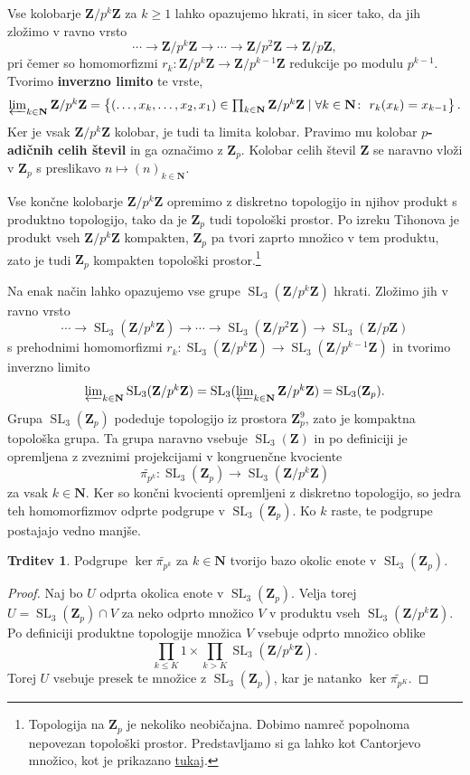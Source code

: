 \documentclass[11pt]{book}
\def\NN{\mathbf{N}}
\def\ZZ{\mathbf{Z}}
\DeclareMathOperator\SL{SL}
\def\definicija{\color{rdeca}\bf}
\theoremstyle{definition}
\theoremstyle{zgled}
\theoremstyle{zgledbrezstevilke}
\theoremstyle{odprtproblem}
\theoremstyle{domacanaloga}
\newenvironment{dokaz}
    {\color{siva}\begin{proof}}
    {\end{proof}}
\theoremstyle{izrek}
\newtheorem{trditev}[theorem]{Trditev}
\begin{document}
Vse kolobarje $\ZZ/p^k\ZZ$ za $k \geq 1$ lahko opazujemo hkrati, in sicer tako, da jih zložimo v ravno vrsto
\[
    \cdots \to \ZZ/p^k\ZZ \to \cdots \to \ZZ/p^2\ZZ \to \ZZ/p\ZZ,
\]
pri čemer so homomorfizmi $r_k \colon \ZZ/p^k\ZZ \to \ZZ/p^{k-1}\ZZ$ redukcije po modulu $p^{k-1}$. Tvorimo {\definicija inverzno limito} te vrste,
\[
    \textstyle \varprojlim_{k \in \NN} \ZZ/p^k\ZZ
    = \left\{
        (\dots, x_k, \dots, x_2, x_1) \in \prod_{k \in \NN} \ZZ/p^k\ZZ \mid
        \forall k \in \NN \colon \ r_k(x_k) = x_{k-1}
    \right\}.
\]
Ker je vsak $\ZZ/p^k\ZZ$ kolobar, je tudi ta limita kolobar. Pravimo mu kolobar {\definicija $p$-adičnih celih števil} in ga označimo z $\ZZ_p$. Kolobar celih števil $\ZZ$ se naravno vloži v $\ZZ_p$ s preslikavo $n \mapsto (n)_{k \in \NN}$.

Vse končne kolobarje $\ZZ/p^k\ZZ$ opremimo z diskretno topologijo in njihov produkt s produktno topologijo, tako da je $\ZZ_p$ tudi topološki prostor. Po izreku Tihonova je produkt vseh $\ZZ/p^k\ZZ$ kompakten, $\ZZ_p$ pa tvori zaprto množico v tem produktu, zato je tudi $\ZZ_p$ kompakten topološki prostor.\footnote{Topologija na $\ZZ_p$ je nekoliko neobičajna. Dobimo namreč popolnoma nepovezan topološki prostor. Predstavljamo si ga lahko kot Cantorjevo množico, kot je prikazano \href{http://roice3.org/padics/}{tukaj}.}

Na enak način lahko opazujemo vse grupe $\SL_3(\ZZ/p^k\ZZ)$ hkrati. Zložimo jih v ravno vrsto
\[
    \textstyle \cdots \to \SL_3(\ZZ/p^k\ZZ) \to \cdots \to \SL_3(\ZZ/p^2\ZZ) \to \SL_3(\ZZ/p\ZZ)
\]
s prehodnimi homomorfizmi $r_k \colon \SL_3(\ZZ/p^k\ZZ) \to \SL_3(\ZZ/p^{k-1}\ZZ)$ in tvorimo inverzno limito
\[
    \textstyle \varprojlim_{k \in \NN} \SL_3(\ZZ/p^k\ZZ)
    = \SL_3(\varprojlim_{k \in \NN} \ZZ/p^k\ZZ)
    = \SL_3(\ZZ_p).
\]
Grupa $\SL_3(\ZZ_p)$ podeduje topologijo iz prostora $\ZZ_p^9$, zato je kompaktna topološka grupa. Ta grupa naravno vsebuje $\SL_3(\ZZ)$ in po definiciji je opremljena z zveznimi projekcijami v kongruenčne kvociente 
\[
    \textstyle \widetilde{\pi_{p^k}} \colon \SL_3(\ZZ_p) \to \SL_3(\ZZ/p^k\ZZ)
\]
za vsak $k \in \NN$. Ker so končni kvocienti opremljeni z diskretno topologijo, so jedra teh homomorfizmov odprte podgrupe v $\SL_3(\ZZ_p)$. Ko $k$ raste, te podgrupe postajajo vedno manjše.

\begin{trditev}
Podgrupe $\ker \widetilde{\pi_{p^k}}$ za $k \in \NN$ tvorijo bazo okolic enote v $\SL_3(\ZZ_p)$.
\end{trditev}
\begin{dokaz}
Naj bo $U$ odprta okolica enote v $\SL_3(\ZZ_p)$. Velja torej $U = \SL_3(\ZZ_p) \cap V$ za neko odprto množico $V$ v produktu vseh $\SL_3(\ZZ/p^k\ZZ)$. Po definiciji produktne topologije množica $V$ vsebuje odprto množico oblike
\[
    \prod_{k \leq K} 1 \times \prod_{k > K} {\textstyle \SL_3(\ZZ/p^k\ZZ)}.
\]
Torej $U$ vsebuje presek te množice z $\SL_3(\ZZ_p)$, kar je natanko $\ker \widetilde{\pi_{p^K}}$.
\end{dokaz}
\end{document}
